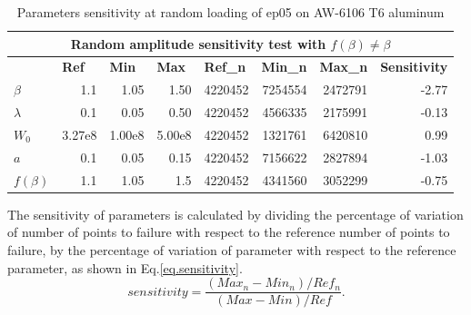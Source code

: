 \documentclass[3p,times,procedia,number]{elsarticle}
\begin{document}
\begin{table}[!h]
	\centering
	\begin{tabular}{lrrrrrrr}
		\hline
		\multicolumn{8}{c}{\textbf{Random amplitude sensitivity test with $f(\beta)\neq\beta$}}                                                                                                                                                                                                   \\ \hline
		\textbf{}           & \multicolumn{1}{l}{\textbf{Ref}} & \multicolumn{1}{l}{\textbf{Min}} & \multicolumn{1}{l}{\textbf{Max}} & \multicolumn{1}{l}{\textbf{Ref\_n}} & \multicolumn{1}{l}{\textbf{Min\_n}} & \multicolumn{1}{l}{\textbf{Max\_n}} & \multicolumn{1}{l}{\textbf{Sensitivity}} \\ \hline
		\textbf{$\beta$}    & 1.1                              & 1.05                             & 1.50                             & 4220452                             & 7254554                             & 2472791                             & -2.77                                    \\
		\textbf{$\lambda$}  & 0.1                              & 0.05                             & 0.50                             & 4220452                             & 4566335                             & 2175991                             & -0.13                                    \\
		\textbf{$W_0$}      & 3.27e8                         & 1.00e8                         & 5.00e8                         & 4220452                             & 1321761                             & 6420810                             & 0.99                                     \\
		\textbf{$a$}        & 0.1                              & 0.05                             & 0.15                             & 4220452                             & 7156622                             & 2827894                             & -1.03                                    \\
		\textbf{$f(\beta)$} & 1.1                              & 1.05                             & 1.5                              & 4220452                             & 4341560                             & 3052299                             & -0.75                                    \\ \hline
	\end{tabular}
	\caption{Parameters sensitivity at random loading of ep05 on AW-6106 T6 aluminum}
	\label{tab.sensitivity_random2}
\end{table}
The sensitivity of parameters is calculated by dividing the percentage of variation of  number of points to failure with respect to the reference number of points to failure, by the percentage of variation of parameter with respect to the reference parameter, as shown in Eq.\eqref{eq.sensitivity}.
\begin{equation}
sensitivity = \dfrac{\left( Max_n-Min_n\right)/Ref_n}{\left( Max-Min\right)/Ref}.
\label{eq.sensitivity}
\end{equation}
\end{document}
